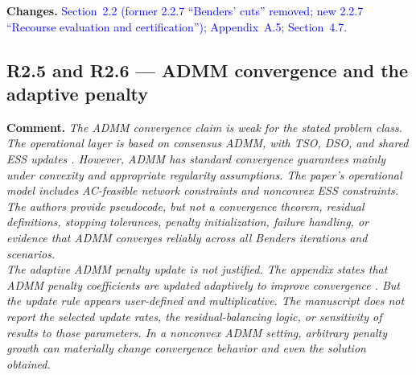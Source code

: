 \documentclass[11pt]{article}
\newcommand{\rcomment}[1]{\par\medskip\noindent\textbf{Comment.} \textit{#1}\par\smallskip}
\newcommand{\rchanges}[1]{\noindent\textbf{Changes.} \textcolor{blue}{#1}\par\medskip}
\begin{document}
\rchanges{
    Section~2.2 (former 2.2.7 ``Benders' cuts'' removed; 
    new 2.2.7 ``Recourse evaluation and certification''); 
    Appendix~A.5; Section~4.7.
}

\subsection*{R2.5 and R2.6 --- ADMM convergence and the adaptive penalty}
\rcomment{
The ADMM convergence claim is weak for the stated problem class. The operational layer is based on consensus ADMM, with TSO, DSO, and shared ESS updates . However, ADMM has standard convergence guarantees mainly under convexity and appropriate regularity assumptions. The paper's operational model includes AC-feasible network constraints and nonconvex ESS constraints. The authors provide pseudocode, but not a convergence theorem, residual definitions, stopping tolerances, penalty initialization, failure handling, or evidence that ADMM converges reliably across all Benders iterations and scenarios.\\
The adaptive ADMM penalty update is not justified. The appendix states that ADMM penalty coefficients are updated adaptively to improve convergence . But the update rule appears user-defined and multiplicative. The manuscript does not report the selected update rates, the residual-balancing logic, or sensitivity of results to those parameters. In a nonconvex ADMM setting, arbitrary penalty growth can materially change convergence behavior and even the solution obtained.
}
\end{document}
